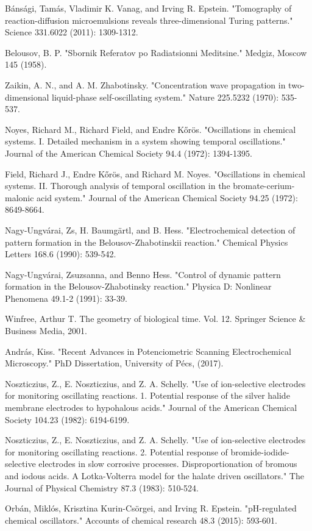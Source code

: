 \documentclass[3p, twocolumn]{elsarticle}
\begin{document}
\begin{thebibliography}{5}
Bánsági, Tamás, Vladimir K. Vanag, and Irving R. Epstein. "Tomography of reaction-diffusion microemulsions reveals three-dimensional Turing patterns." Science 331.6022 (2011): 1309-1312.

Belousov, B. P. "Sbornik Referatov po Radiatsionni Meditsine." Medgiz, Moscow 145 (1958).

Zaikin, A. N., and A. M. Zhabotinsky. "Concentration wave propagation in two-dimensional liquid-phase self-oscillating system." Nature 225.5232 (1970): 535-537.

Noyes, Richard M., Richard Field, and Endre Kőrös. "Oscillations in chemical systems. I. Detailed mechanism in a system showing temporal oscillations." Journal of the American Chemical Society 94.4 (1972): 1394-1395.

Field, Richard J., Endre Kőrös, and Richard M. Noyes. "Oscillations in chemical systems. II. Thorough analysis of temporal oscillation in the bromate-cerium-malonic acid system." Journal of the American Chemical Society 94.25 (1972): 8649-8664.


Nagy-Ungvárai, Zs, H. Baumgärtl, and B. Hess. "Electrochemical detection of pattern formation in the Belousov-Zhabotinskii reaction." Chemical Physics Letters 168.6 (1990): 539-542. 

Nagy-Ungvárai, Zsuzsanna, and Benno Hess. "Control of dynamic pattern formation in the Belousov-Zhabotinsky reaction." Physica D: Nonlinear Phenomena 49.1-2 (1991): 33-39.

Winfree, Arthur T. The geometry of biological time. Vol. 12. Springer Science \& Business Media, 2001.

András, Kiss. "Recent Advances in Potenciometric Scanning Electrochemical Microscopy." PhD Dissertation, University of Pécs, (2017).

Noszticzius, Z., E. Noszticzius, and Z. A. Schelly. "Use of ion-selective electrodes for monitoring oscillating reactions. 1. Potential response of the silver halide membrane electrodes to hypohalous acids." Journal of the American Chemical Society 104.23 (1982): 6194-6199.

Noszticzius, Z., E. Noszticzius, and Z. A. Schelly. "Use of ion-selective electrodes for monitoring oscillating reactions. 2. Potential response of bromide-iodide-selective electrodes in slow corrosive processes. Disproportionation of bromous and iodous acids. A Lotka-Volterra model for the halate driven oscillators." The Journal of Physical Chemistry 87.3 (1983): 510-524.

Orbán, Miklós, Krisztina Kurin-Csörgei, and Irving R. Epstein. "pH-regulated chemical oscillators." Accounts of chemical research 48.3 (2015): 593-601.
\end{thebibliography}
\end{document}
